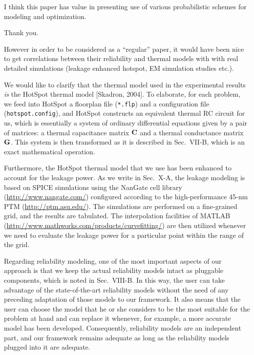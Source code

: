 \begin{reviewer}
I think this paper has value in presenting use of various probabilistic schemes
for modeling and optimization.
\end{reviewer}

\begin{authors}
  Thank you.
\end{authors}

\begin{reviewer}
However in order to be considered as a ``regular'' paper, it would have been
nice to get correlations between their reliability and thermal models with with
real detailed simulations (leakage enhanced hotspot, EM simulation studies
etc.).
\end{reviewer}

\begin{authors}
We would like to clarify that the thermal model used in the experimental results
\emph{is} the HotSpot thermal model [Skadron, 2004]. To elaborate, for each
problem, we feed into HotSpot a floorplan file (\texttt{*.flp}) and a
configuration file (\texttt{hotspot.config}), and HotSpot constructs an
equivalent thermal RC circuit for us, which is essentially a system of ordinary
differential equations given by a pair of matrices: a thermal capacitance matrix
$\mathbf{C}$ and a thermal conductance matrix $\mathbf{G}$. This system is then
transformed as it is described in Sec.~VII-B, which is an exact mathematical
operation.

Furthermore, the HotSpot thermal model that we use has been enhanced to account
for the leakage power. As we write in Sec.~X-A, the leakage modeling is based on
SPICE simulations using the NanGate cell library (\url{http://www.nangate.com/})
configured according to the high-performance 45-nm PTM
(\url{http://ptm.asu.edu/}). The simulations are performed on a fine-grained
grid, and the results are tabulated. The interpolation facilities of MATLAB
(\url{http://www.mathworks.com/products/curvefitting/}) are then utilized
whenever we need to evaluate the leakage power for a particular point within the
range of the grid.

Regarding reliability modeling, one of the most important aspects of our
approach is that we keep the actual reliability models intact as pluggable
components, which is noted in Sec.~VIII-B. In this way, the user can take
advantage of the state-of-the-art reliability models without the need of any
preceding adaptation of those models to our framework. It also means that the
user can choose the model that he or she considers to be the most suitable for
the problem at hand and can replace it whenever, for example, a more accurate
model has been developed. Consequently, reliability models are an independent
part, and our framework remains adequate as long as the reliability models
plugged into it are adequate.

\begin{actions}
\end{actions}
\end{authors}

